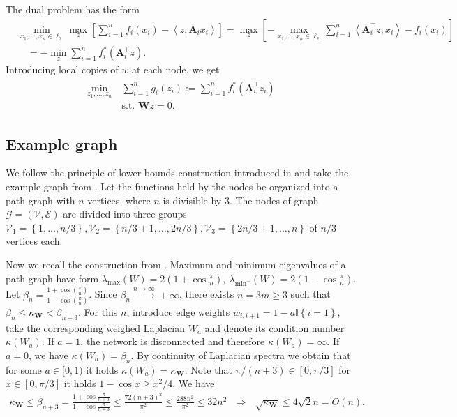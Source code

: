 \documentclass{article}
\newcommand{\cG}{\mathcal{G}}
\newcommand{\cV}{\mathcal{V}}
\newcommand{\cE}{\mathcal{E}}
\newcommand{\mA}{\mathbf{A}}
\newcommand{\mW}{\mathbf{W}}
\newcommand{\angles}[1]{\left\langle #1 \right\rangle}
\newcommand{\cbraces}[1]{\left( #1 \right)}
\newcommand{\sbraces}[1]{\left[ #1 \right]}
\newcommand{\braces}[1]{\left\{ #1 \right\}}
\begin{document}
The dual problem has the form
\begin{equation}
\begin{aligned}
  \label{prob:lower_dual}
	&\min_{x_1, \ldots, x_n\in\ell_2} \max_{z} \sbraces{\sum_{i=1}^n f_i(x_i) - \angles{z, \mA_i x_i}} 
	= \max_z \sbraces{-\max_{x_1, \ldots, x_n\in\ell_2} \sum_{i=1}^n \angles{\mA_i^\top z, x_i} - f_i(x_i)} \\
	&\quad= -\min_z \sum_{i=1}^n f_i^*(\mA_i^\top z).
\end{aligned}
\end{equation}
Introducing local copies of $w$ at each node, we get
\begin{align}\label{eq:lower_bound_dual_problem}
\begin{aligned}
	\min_{z_1, \ldots, z_n}~ &\sum_{i=1}^n g_i(z_i) := \sum_{i=1}^n f_i^* (\mA_i^\top z_i) \\
	&\text{s.t. } \mW z = 0.
\end{aligned}
\end{align}


\subsection{Example  graph}

We follow the principle of lower bounds construction introduced in \cite{kovalev2021lower} and take the example graph from \cite{scaman2017optimal}. Let the functions held by the nodes be organized into a path graph with $n$ vertices, where $n$ is divisible by $3$. The nodes of graph $\cG = (\cV, \cE)$ are divided into three groups $\cV_1 = \braces{1, \ldots, n/3}, \cV_2 = \braces{n/3 + 1, \ldots, 2n/3}, \cV_3 = \braces{2n/3 + 1, \ldots, n}$ of $n/3$ vertices each.

Now we recall the construction from \cite{scaman2017optimal}. Maximum and minimum eigenvalues of a path graph have form $\lambda_{\max}(W) = 2\cbraces{1 + \cos\frac{\pi}{n}},~ \lambda_{\min^+}(W) = 2\cbraces{1 - \cos\frac{\pi}{n}}$. Let $\beta_n = \frac{1 + \cos\cbraces{\frac{\pi}{n}}}{1 - \cos\cbraces{\frac{\pi}{n}}}$. Since $\beta_n\overset{n\to\infty}{\rightarrow} +\infty$, there exists $n = 3m\geq 3$ such that $\beta_n\leq \kappa_\mW < \beta_{n+3}$. For this $n$, introduce edge weights $w_{i, i+1} = 1 - a\mathbb{I}\braces{i=1}$, take the corresponding weighed Laplacian $W_a$ and denote its condition number $\kappa(W_a)$. If $a = 1$, the network is disconnected and therefore $\kappa(W_a) = \infty$. If $a = 0$, we have $\kappa(W_a) = \beta_n$.  By continuity of Laplacian spectra we obtain that for some $a \in [0, 1)$ it holds $\kappa(W_a) = \kappa_\mW$. Note that $\pi/(n+3)\in[0, \pi/3]$ for $x\in[0, \pi/3]$ it holds $1 - \cos x\geq x^2/4$. We have
\begin{align}\label{eq:n_chi_relation}
	\kappa_\mW\leq \beta_{n+3} = \frac{1 + \cos\frac{\pi}{n+3}}{1 - \cos\frac{\pi}{n+3}}
	\leq \frac{72(n+3)^2}{\pi^2}\leq \frac{288 n^2}{\pi^2}\leq 32n^2~~~\Rightarrow~~~ \sqrt{\kappa_\mW}\leq 4\sqrt 2n = O(n).
\end{align}
\end{document}
